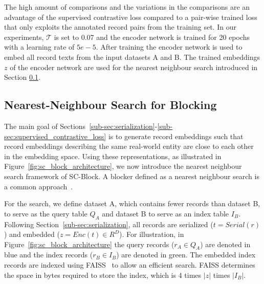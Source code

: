 \documentclass[sigconf,nonacm]{acmart}
\begin{document}
The high amount of comparisons and the variations in the comparisons are an advantage of the supervised contrastive loss compared to a pair-wise trained loss that only exploits the annotated record pairs from the training set.
In our experiments, $\mathcal{T}$ is set to 0.07 and the encoder network is trained for 20 epochs with a learning rate of $5e-5$.
After training the encoder network is used to embed all record texts from the input datasets A and B. The trained embeddings $z$ of the encoder network are used for the nearest neighbour search introduced in Section \ref{sub-sec:blocking-framework}.

\subsection{Nearest-Neighbour Search for Blocking}
\label{sub-sec:blocking-framework}

The main goal of Sections~\ref{sub-sec:serialization}-\ref{sub-sec:supervised_contrastive_loss} is to generate record embeddings such that record embeddings describing the same real-world entity are close to each other in the embedding space. Using these representations, as illustrated in Figure~\ref{fig:sc_block_architecture}, we now introduce the nearest neighbour search framework of SC-Block. A blocker defined as a nearest neighbour search is a common approach~\cite{thirumuruganathan_deep_2021, zhang_autoblock_2020, wang_sudowoodo_2022}.

For the search, we define dataset A, which contains fewer records than dataset B, to serve as the query table $Q_A$ and dataset B to serve as an index table $I_B$. Following Section~\ref{sub-sec:serialization}, all records are  serialized ($t = Serial(r)$) and embedded ($z = Enc(t) \in R^D$). For illustration, in Figure~\ref{fig:sc_block_architecture} the query records ($r_A \in Q_A$) are denoted in blue and the index records ($r_B \in I_B$) are denoted in green. The embedded index records are indexed using FAISS~\cite{johnson_billion-scale_2021} to allow an efficient search. FAISS determines the space in bytes required to store the index, which is 4 times $|z|$ times $|I_B|$.
\end{document}
